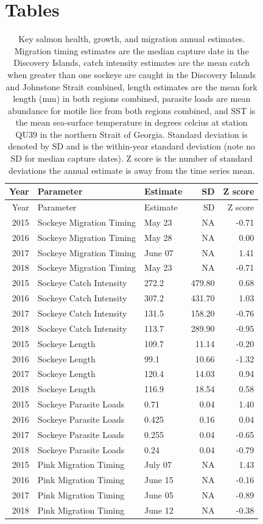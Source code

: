 \documentclass[fleqn,10pt]{wlpeerj} %
\begin{document}
\hypertarget{tables}{%
\section{Tables}\label{tables}}

\begin{longtable}[]{@{}rllrr@{}}
\caption{\label{tab:z-scores-table} Key salmon health, growth, and migration annual estimates. Migration timing estimates are the median capture date in the Discovery Islands, catch intensity estimates are the mean catch when greater than one sockeye are caught in the Discovery Islands and Johnstone Strait combined, length estimates are the mean fork length (mm) in both regions combined, parasite loads are mean abundance for motile lice from both regions combined, and SST is the mean sea-surface temperature in degrees celcius at station QU39 in the northern Strait of Georgia. Standard deviation is denoted by SD and is the within-year standard deviation (note no SD for median capture dates). Z score is the number of standard deviations the annual estimate is away from the time series mean.}\tabularnewline
\toprule
Year & Parameter & Estimate & SD & Z score\tabularnewline
\midrule
\endfirsthead
\toprule
Year & Parameter & Estimate & SD & Z score\tabularnewline
\midrule
\endhead
2015 & Sockeye Migration Timing & May 23 & NA & -0.71\tabularnewline
2016 & Sockeye Migration Timing & May 28 & NA & 0.00\tabularnewline
2017 & Sockeye Migration Timing & June 07 & NA & 1.41\tabularnewline
2018 & Sockeye Migration Timing & May 23 & NA & -0.71\tabularnewline
2015 & Sockeye Catch Intensity & 272.2 & 479.80 & 0.68\tabularnewline
2016 & Sockeye Catch Intensity & 307.2 & 431.70 & 1.03\tabularnewline
2017 & Sockeye Catch Intensity & 131.5 & 158.20 & -0.76\tabularnewline
2018 & Sockeye Catch Intensity & 113.7 & 289.90 & -0.95\tabularnewline
2015 & Sockeye Length & 109.7 & 11.14 & -0.20\tabularnewline
2016 & Sockeye Length & 99.1 & 10.66 & -1.32\tabularnewline
2017 & Sockeye Length & 120.4 & 14.03 & 0.94\tabularnewline
2018 & Sockeye Length & 116.9 & 18.54 & 0.58\tabularnewline
2015 & Sockeye Parasite Loads & 0.71 & 0.04 & 1.40\tabularnewline
2016 & Sockeye Parasite Loads & 0.425 & 0.16 & 0.04\tabularnewline
2017 & Sockeye Parasite Loads & 0.255 & 0.04 & -0.65\tabularnewline
2018 & Sockeye Parasite Loads & 0.24 & 0.04 & -0.79\tabularnewline
2015 & Pink Migration Timing & July 07 & NA & 1.43\tabularnewline
2016 & Pink Migration Timing & June 15 & NA & -0.16\tabularnewline
2017 & Pink Migration Timing & June 05 & NA & -0.89\tabularnewline
2018 & Pink Migration Timing & June 12 & NA & -0.38\tabularnewline

\end{longtable}
\end{document}
